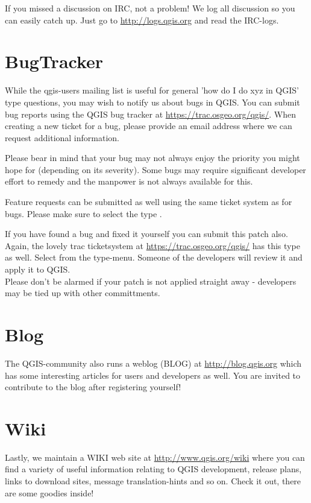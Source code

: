 If you missed a discussion on IRC, not a problem! We log all discussion so you can 
easily catch up. Just go to \url{http://logs.qgis.org} and read the IRC-logs.

\section{BugTracker}
While the qgis-users mailing list is useful for general 'how do I do xyz in
QGIS' type questions, you may wish to notify us about bugs in QGIS. You can
submit bug reports using the QGIS bug tracker at \url{https://trac.osgeo.org/qgis/}. 
When creating a new ticket for a bug, please provide an email
address where we can request additional information.

Please bear in
mind that your bug may not always enjoy the priority you might hope for
(depending on its severity). Some bugs may require significant
developer effort to remedy and the manpower is not always available for this.

Feature requests can be submitted as well using the same ticket system as for bugs.
Please make sure to select the type .

If you have found a bug and fixed it yourself you can submit this patch also.
Again, the lovely trac ticketsystem at \url{https://trac.osgeo.org/qgis/} has this 
type as well. Select  from the type-menu. Someone of the 
developers will review it and apply it to QGIS. \\
Please don't be alarmed if your patch is not applied straight away - developers
may be tied up with other committments.


\section{Blog}
The QGIS-community also runs a weblog (BLOG) at \url{http://blog.qgis.org} 
which has some interesting articles for users and developers as well. 
You are invited to contribute to the blog after registering yourself!

\section{Wiki}
Lastly, we maintain a WIKI web site at \url{http://www.qgis.org/wiki} where you 
can find a variety of useful information relating to QGIS development, 
release plans, links to download sites, message translation-hints and so on. 
Check it out, there are some goodies inside!

